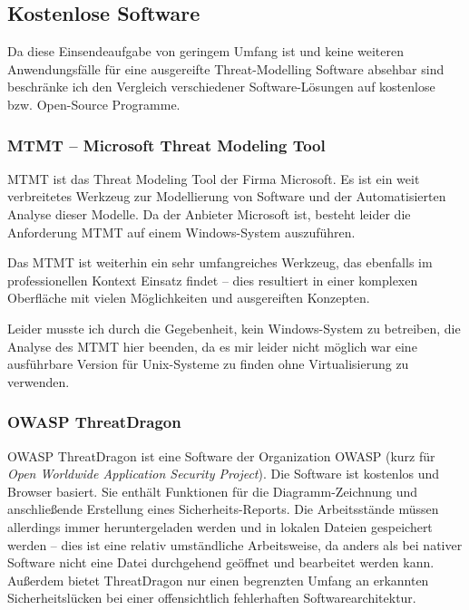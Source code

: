 \documentclass{article}
\begin{document}

\subsection*{Kostenlose Software}

Da diese Einsendeaufgabe von geringem Umfang ist und keine weiteren Anwendungsfälle für 
eine ausgereifte Threat-Modelling Software absehbar sind beschränke ich den Vergleich 
verschiedener Software-Lösungen auf kostenlose bzw. Open-Source Programme.

\subsubsection*{MTMT – Microsoft Threat Modeling Tool}

MTMT ist das Threat Modeling Tool der Firma Microsoft. Es ist ein weit verbreitetes 
Werkzeug zur Modellierung von Software und der Automatisierten Analyse dieser Modelle. Da 
der Anbieter Microsoft ist, besteht leider die Anforderung MTMT auf einem Windows-System 
auszuführen.

Das MTMT ist weiterhin ein sehr umfangreiches Werkzeug, das ebenfalls im professionellen 
Kontext Einsatz findet – dies resultiert in einer komplexen Oberfläche mit 
vielen Möglichkeiten und ausgereiften Konzepten.

Leider musste ich durch die Gegebenheit, kein Windows-System zu betreiben, die Analyse 
des MTMT hier beenden, da es mir leider nicht möglich war eine ausführbare Version für 
Unix-Systeme zu finden ohne Virtualisierung zu verwenden.

\subsubsection*{OWASP ThreatDragon}

OWASP ThreatDragon ist eine Software der Organization OWASP (kurz für \textit{Open 
Worldwide Application Security Project}). Die Software ist kostenlos und
Browser basiert. Sie enthält Funktionen für die Diagramm-Zeichnung und anschließende 
Erstellung eines Sicherheits-Reports. Die Arbeitsstände müssen allerdings immer 
heruntergeladen werden und in lokalen Dateien gespeichert werden – dies ist eine relativ 
umständliche Arbeitsweise, da anders als bei nativer Software nicht eine Datei durchgehend 
geöffnet und bearbeitet werden kann. Außerdem bietet ThreatDragon nur einen begrenzten 
Umfang an erkannten Sicherheitslücken bei einer offensichtlich fehlerhaften 
Softwarearchitektur.
\end{document}
